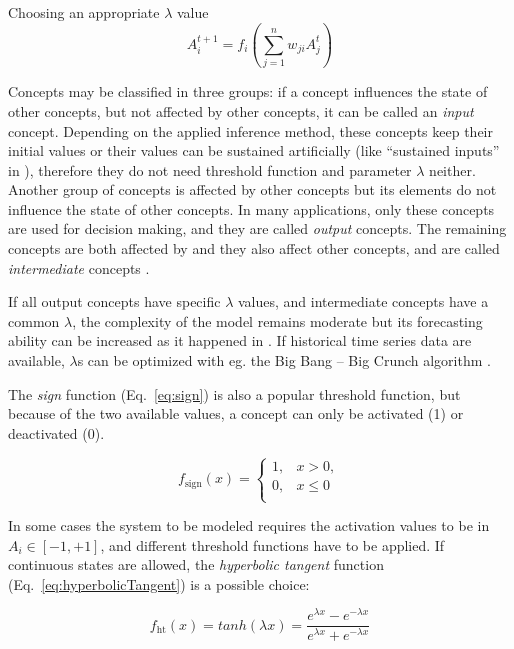 \documentclass[graybox]{svmult}
\begin{document}
\begin{backgroundinformation}{Choosing an appropriate $\lambda$ value}
\begin{equation}
\label{eq:inferenceMultilambda}
A_{i}^{t+1} = f_i \left( \sum_{j=1}^{n} w_{ji}A_{j}^{t} \right)
\end{equation}

Concepts may be classified in three groups: if a concept influences the state of other concepts, but not affected by other concepts, it can be called an \emph{input} concept. Depending on the applied inference method, these concepts keep their initial values or their values can be sustained artificially (like ``sustained inputs'' in \cite{dickerson1994virtual}), therefore they do not need threshold function and parameter $\lambda$ neither. Another group of concepts is affected by other concepts but its elements do not influence the state of other concepts. In many applications, only these concepts are used for decision making, and they are called \emph{output} concepts. The remaining concepts are both affected by and they also affect other concepts, and are called \emph{intermediate} concepts \cite{boutalis2014system}.

If all output concepts have specific $\lambda$ values, and intermediate concepts have a common $\lambda$, the complexity of the model remains moderate but its forecasting ability can be increased as it happened in \cite{hatwagner2018two}. If historical time series data are available, $\lambda$s can be optimized with eg. the Big Bang -- Big Crunch algorithm \cite{yesilenginurbasleon2010}.
\end{backgroundinformation}

The \emph{sign} function (Eq.~\ref{eq:sign}) is also a popular threshold function, but because of the two available values, a concept can only be activated (1) or deactivated (0). 

\begin{equation}
\label{eq:sign}
f_{\textrm{sign}}(x) = \left\{
\begin{array}{ll}
1, & x>0, \\
0, & x \leq 0 \\
\end{array}
\right.
\end{equation}

In some cases the system to be modeled requires the activation values to be in $A_i\in [-1, +1]$, and different threshold functions have to be applied. If continuous states are allowed, the \emph{hyperbolic tangent} function (Eq.~\ref{eq:hyperbolicTangent}) is a possible choice:

\begin{equation}
\label{eq:hyperbolicTangent}
f_{\textrm{ht}}(x) = tanh(\lambda x) = \frac{e^{\lambda x}-e^{-\lambda x}}{e^{\lambda x}+e^{-\lambda x}}
\end{equation}
\end{document}
